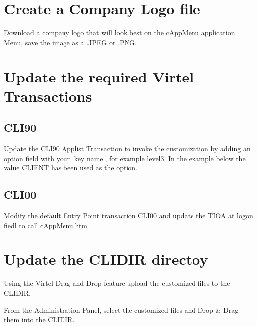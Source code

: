 \documentclass[letterpaper,10pt,english]{sphinxmanual}
\begin{document}
\section{Create a Company Logo file}
\label{\detokenize{Customization:create-a-company-logo-file}}
\sphinxAtStartPar
Download a company logo that will look best on the cAppMenu application Menu, save the image as a .JPEG or .PNG.

\sphinxAtStartPar
{}


\section{Update the required Virtel Transactions}
\label{\detokenize{Customization:update-the-required-virtel-transactions}}

\subsection{CLI\sphinxhyphen{}90}
\label{\detokenize{Customization:cli-90}}
\sphinxAtStartPar
Update the CLI\sphinxhyphen{}90 Applist Transaction to invoke the customization by adding an option field with your {[}key name{]}, for example level3. In the example below the value CLIENT has been used as the option.

\sphinxAtStartPar
{}


\subsection{CLI\sphinxhyphen{}00}
\label{\detokenize{Customization:cli-00}}
\sphinxAtStartPar
Modify the default Entry Point transaction CLI\sphinxhyphen{}00 and update the TIOA at logon fiedl to call cAppMenu.htm

\sphinxAtStartPar
{}


\section{Update the CLI\sphinxhyphen{}DIR directoy}
\label{\detokenize{Customization:update-the-cli-dir-directoy}}
\sphinxAtStartPar
Using the Virtel Drag and Drop feature upload the customized files to the CLI\sphinxhyphen{}DIR.

\sphinxAtStartPar
{}

\sphinxAtStartPar
From the Administration Panel, select the customized files and Drop \& Drag them into the CLI\sphinxhyphen{}DIR.
\end{document}
